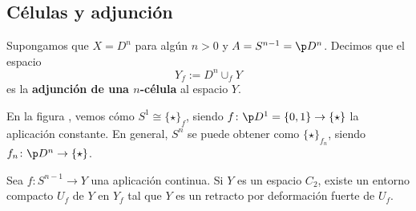 \subsection{Células y adjunción}
Supongamos que $X=D^n$ para algún $n > 0$ y $A=S^{n-1}=\p D^n$. Decimos que el
espacio
\[Y_f:=D^n\cup_f Y\]
es la \textbf{adjunción de una $n$-célula} al espacio $Y$.

\begin{example}
En la figura , vemos cómo $S^1\cong \{\star\}_f$, siendo
$f\colon \p D^1=\{0,1\}\to \{\star\}$ la aplicación constante. En general,
$S^n$ se puede obtener como $\{\star\}_{f_n}$, siendo $f_n\colon \p D^n \to
\{\star\}$.
\end{example}

\begin{lemma}
Sea $f: S^{n-1} \to Y$ una aplicación continua. Si $Y$ es un espacio $C_2$,
existe un entorno compacto $U_f$ de $Y$ en $Y_f$ tal que $Y$ es un retracto
por deformación fuerte de $U_f$.
\end{lemma}

